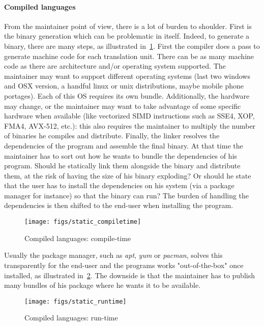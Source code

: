 \paragraph{Compiled languages} From the maintainer point of view, there is a lot of burden to shoulder. First is the
binary generation which can be problematic in itself. Indeed, to generate a binary, there are many steps, as illustrated
in~\cref{fig:static.dynamic.compiled.compiletime}. First the compiler does a pass to generate machine code for each
translation unit. There can be as many machine code as there are architecture and/or operating system supported. The
maintainer may want to support different operating systems (last two windows and OSX version, a handful linux or unix
distributions, maybe mobile phone portages). Each of this OS requires its own bundle. Additionally, the hardware may
change, or the maintainer may want to take advantage of some specific hardware when available (like vectorized SIMD
instructions such as SSE4, XOP, FMA4, AVX-512, etc.): this also requires the maintainer to multiply the number of
binaries he compiles and distribute. Finally, the linker resolves the dependencies of the program and assemble the final
binary. At that time the maintainer has to sort out how he wants to bundle the dependencies of his program. Should he
statically link them alongside the binary and distribute them, at the risk of having the size of his binary exploding?
Or should he state that the user has to install the dependencies on his system (via a package manager for instance) so
that the binary can run? The burden of handling the dependencies is then shifted to the end-user when installing the
program.

\begin{figure}[tbh]
  \centering
  \texttt{[image: figs/static\_compiletime]}
  \caption{Compiled languages: compile-time}
  \label{fig:static.dynamic.compiled.compiletime}
\end{figure}


Usually the package manager, such as \emph{apt}, \emph{yum} or \emph{pacman}, solves this transparently for the end-user
and the programs works "out-of-the-box" once installed, as illustrated in~\cref{fig:static.dynamic.compiled.runtime}.
The downside is that the maintainer has to publish many bundles of his package where he wants it to be available.

\begin{figure}[tbh]
  \centering
  \texttt{[image: figs/static\_runtime]}
  \caption{Compiled languages: run-time}
  \label{fig:static.dynamic.compiled.runtime}
\end{figure}

